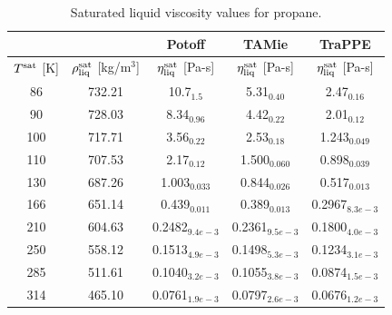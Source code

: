 \documentclass[preprint,review,12pt]{elsarticle}
\begin{document}
	\begin{table}[h!]
		\caption{Saturated liquid viscosity values for propane.}
		\begin{center}
			\begin{tabular}{|c|c|c|c|c|}
				\hline
				&                                       & Potoff            & TAMie             & TraPPE            \\ \hline
				$T^{\rm sat}$ {[}K{]} & $\rho^{\rm sat}_{\rm liq}$ [kg/m$^3$] & $\eta_{\rm liq}^{\rm sat}$ {[}Pa-s{]} & $\eta_{\rm liq}^{\rm sat}$ {[}Pa-s{]} & $\eta_{\rm liq}^{\rm sat}$ {[}Pa-s{]} \\ \hline
				86 & 732.21 & 10.7$_{1.5}$      & 5.31$_{0.40}$     & 2.47$_{0.16}$     \\ \hline
				90 & 728.03 & 8.34$_{0.96}$     & 4.42$_{0.22}$     & 2.01$_{0.12}$     \\ \hline
				100  & 717.71 & 3.56$_{0.22}$     & 2.53$_{0.18}$     & 1.243$_{0.049}$   \\ \hline
				110  & 707.53 & 2.17$_{0.12}$     & 1.500$_{0.060}$   & 0.898$_{0.039}$   \\ \hline
				130  & 687.26 & 1.003$_{0.033}$   & 0.844$_{0.026}$   & 0.517$_{0.013}$   \\ \hline
				166  & 651.14 & 0.439$_{0.011}$   & 0.389$_{0.013}$   & 0.2967$_{8.3e-3}$ \\ \hline
				210  & 604.63 & 0.2482$_{9.4e-3}$ & 0.2361$_{9.5e-3}$ & 0.1800$_{4.0e-3}$ \\ \hline
				250  & 558.12 & 0.1513$_{4.9e-3}$ & 0.1498$_{5.3e-3}$ & 0.1234$_{3.1e-3}$ \\ \hline
				285  & 511.61 & 0.1040$_{3.2e-3}$ & 0.1055$_{3.8e-3}$ & 0.0874$_{1.5e-3}$ \\ \hline
				314  & 465.10 & 0.0761$_{1.9e-3}$ & 0.0797$_{2.6e-3}$ & 0.0676$_{1.2e-3}$ \\ \hline
			\end{tabular}
		\end{center}
	\end{table}
	
\end{document}

